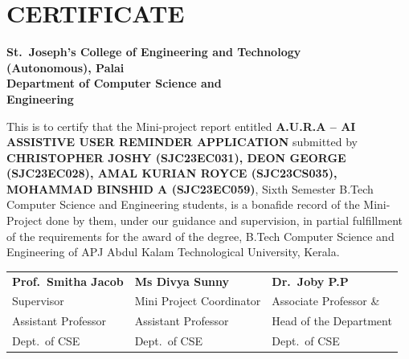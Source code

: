 \documentclass[12pt,a4paper]{report}
\begin{document}

\chapter*{CERTIFICATE}

\begin{center}
{\large\bfseries St.\ Joseph's College of Engineering and Technology\\
(Autonomous), Palai}\\[6pt]
{\large\bfseries Department of Computer Science and\\
Engineering}
\end{center}

\vspace{0.8cm}

\noindent This is to certify that the Mini-project report entitled \textbf{A.U.R.A -- AI ASSISTIVE USER REMINDER APPLICATION} submitted by \textbf{CHRISTOPHER JOSHY (SJC23EC031), DEON GEORGE (SJC23EC028), AMAL KURIAN ROYCE (SJC23CS035), MOHAMMAD BINSHID A (SJC23EC059)}, Sixth Semester B.Tech Computer Science and Engineering students, is a bonafide record of the Mini-Project done by them, under our guidance and supervision, in partial fulfillment of the requirements for the award of the degree, B.Tech Computer Science and Engineering of APJ Abdul Kalam Technological University, Kerala.

\vspace{2.5cm}

\noindent
\begin{tabular}{@{}p{}p{}p{}@{}}
\textbf{Prof.\ Smitha Jacob} & \textbf{Ms Divya Sunny } & \textbf{Dr.\ Joby P.P} \\
Supervisor                 & Mini Project Coordinator   & Associate Professor \& \\
Assistant Professor        & Assistant Professor        & Head of the Department \\
Dept.\ of CSE              & Dept.\ of CSE               & Dept.\ of CSE \\
\end{tabular}
\end{document}
